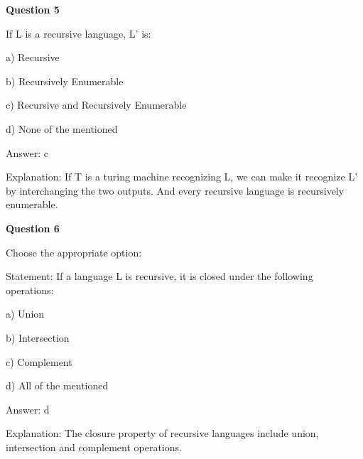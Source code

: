 \documentclass{article}
\begin{document}
\begin{mdframed}[linewidth=1pt, roundcorner=5pt, linecolor=gray!30, backgroundcolor=gray!5]
\textbf{Question 5} 

If L is a recursive language, L' is:

a) Recursive

b) Recursively Enumerable

c) Recursive and Recursively Enumerable

d) None of the mentioned
\vspace{5pt} \par
\begin{tcolorbox}[colback=green!5, colframe=green!40!black, title=Solution]
Answer: c

Explanation: If T is a turing machine recognizing L, we can make it recognize L' by interchanging the two outputs. And every recursive language is recursively enumerable.
\end{tcolorbox}
\end{mdframed}

\begin{mdframed}[linewidth=1pt, roundcorner=5pt, linecolor=gray!30, backgroundcolor=gray!5]
\textbf{Question 6} 

Choose the appropriate option:

Statement: If a language L is recursive, it is closed under the following operations:

a) Union

b) Intersection

c) Complement

d) All of the mentioned
\vspace{5pt} \par
\begin{tcolorbox}[colback=green!5, colframe=green!40!black, title=Solution]
Answer: d

Explanation: The closure property of recursive languages include union, intersection and complement operations.
\end{tcolorbox}
\end{mdframed}
\newpage
\end{document}
